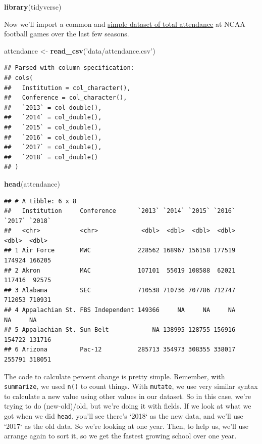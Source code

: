\documentclass[
]{book}
\newenvironment{Shaded}{\begin{snugshade}}{\end{snugshade}}
\newcommand{\KeywordTok}[1]{\textcolor[rgb]{0.13,0.29,0.53}{\textbf{#1}}}
\newcommand{\NormalTok}[1]{#1}
\newcommand{\StringTok}[1]{\textcolor[rgb]{0.31,0.60,0.02}{#1}}
\begin{document}
\begin{Shaded}
\begin{Highlighting}[]
\KeywordTok{library}\NormalTok{(tidyverse)}
\end{Highlighting}
\end{Shaded}

Now we'll import a common and \href{https://unl.box.com/s/oajabnn5614s22jstgcd9ojxo2njn6jt}{simple dataset of total attendance} at NCAA football games over the last few seasons.

\begin{Shaded}
\begin{Highlighting}[]
\NormalTok{attendance <-}\StringTok{ }\KeywordTok{read_csv}\NormalTok{(}\StringTok{'data/attendance.csv'}\NormalTok{)}
\end{Highlighting}
\end{Shaded}

\begin{verbatim}
## Parsed with column specification:
## cols(
##   Institution = col_character(),
##   Conference = col_character(),
##   `2013` = col_double(),
##   `2014` = col_double(),
##   `2015` = col_double(),
##   `2016` = col_double(),
##   `2017` = col_double(),
##   `2018` = col_double()
## )
\end{verbatim}

\begin{Shaded}
\begin{Highlighting}[]
\KeywordTok{head}\NormalTok{(attendance)}
\end{Highlighting}
\end{Shaded}

\begin{verbatim}
## # A tibble: 6 x 8
##   Institution     Conference      `2013` `2014` `2015` `2016` `2017` `2018`
##   <chr>           <chr>            <dbl>  <dbl>  <dbl>  <dbl>  <dbl>  <dbl>
## 1 Air Force       MWC             228562 168967 156158 177519 174924 166205
## 2 Akron           MAC             107101  55019 108588  62021 117416  92575
## 3 Alabama         SEC             710538 710736 707786 712747 712053 710931
## 4 Appalachian St. FBS Independent 149366     NA     NA     NA     NA     NA
## 5 Appalachian St. Sun Belt            NA 138995 128755 156916 154722 131716
## 6 Arizona         Pac-12          285713 354973 308355 338017 255791 318051
\end{verbatim}

The code to calculate percent change is pretty simple. Remember, with \texttt{summarize}, we used \texttt{n()} to count things. With \texttt{mutate}, we use very similar syntax to calculate a new value using other values in our dataset. So in this case, we're trying to do (new-old)/old, but we're doing it with fields. If we look at what we got when we did \texttt{head}, you'll see there's `2018` as the new data, and we'll use `2017` as the old data. So we're looking at one year. Then, to help us, we'll use arrange again to sort it, so we get the fastest growing school over one year.
\end{document}
